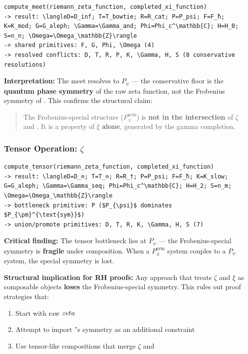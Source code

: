 \documentclass[12pt,a4paper]{article}
\begin{document}
\begin{lstlisting}
compute_meet(riemann_zeta_function, completed_xi_function)
-> result: \langleD=D_inf; T=T_bowtie; R=R_cat; P=P_psi; F=F_ħ; K=K_mod; G=G_aleph; \Gamma=\Gamma_and; Phi=Phi_c^\mathbb{C}; H=H_0; S=n_n; \Omega=\Omega_\mathbb{Z}\rangle
-> shared primitives: F, G, Phi, \Omega (4)
-> resolved conflicts: D, T, R, P, K, \Gamma, H, S (8 conservative resolutions)
\end{lstlisting}

\textbf{Interpretation:} The meet resolves to $P_{\psi}$ --- the conservative floor is the \textbf{quantum phase symmetry} of the raw zeta function, not the Frobenius symmetry of \xi. This confirms the structural claim:

\begin{quote}
The Frobenius-special structure ($P_{\pm}^{\text{sym}}$) is \textbf{not in the intersection} of $\zeta$ and \xi. It is a property of $\xi$ \textbf{alone}, generated by the gamma completion.

\end{quote}

\subsubsection{Tensor Operation: $\zeta$ \otimes \xi}

\begin{lstlisting}
compute_tensor(riemann_zeta_function, completed_xi_function)
-> result: \langleD=D_⊙; T=T_⊙; R=R_†; P=P_psi; F=F_ħ; K=K_slow; G=G_aleph; \Gamma=\Gamma_seq; Phi=Phi_c^\mathbb{C}; H=H_2; S=n_m; \Omega=\Omega_\mathbb{Z}\rangle
-> bottleneck primitive: P ($P_{\psi}$ dominates $P_{\pm}^{\text{sym}}$)
-> union/promote primitives: D, T, R, K, \Gamma, H, S (7)
\end{lstlisting}

\textbf{Critical finding:} The tensor bottleneck lies at $P_{\psi}$ --- the Frobenius-special symmetry is \textbf{fragile} under composition. When a $P_{\pm}^{\text{sym}}$ system couples to a $P_{\psi}$ system, the special symmetry is lost.

\textbf{Structural implication for RH proofs:} Any approach that treats $\zeta$ and $\xi$ as composable objects \textbf{loses} the Frobenius-special symmetry. This rules out proof strategies that:

\begin{enumerate}
    \item Start with raw $\\zeta$
    \item Attempt to import \xi''s symmetry as an additional constraint
    \item Use tensor-like compositions that merge $\zeta$ and \xi
\end{enumerate}
\end{document}
